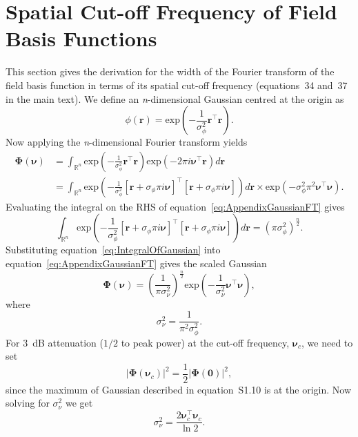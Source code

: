 \documentclass[]{article}
\begin{document}
\section*{Spatial Cut-off Frequency of Field Basis Functions}\label{ap:FrequencyAnalysis}
This section gives the derivation for the width of the Fourier transform of  the field basis function in terms of its spatial cut-off frequency (equations~34 and~37 in the main text). We define an \textit{n}-dimensional Gaussian  centred at the origin as 
\begin{equation}
 \phi(\mathbf r)=\mathrm{exp}\left(-\frac{1}{\sigma_{\phi}^2}\mathbf r^\top\mathbf r\right).
\end{equation}
Now applying the \textit{n}-dimensional Fourier transform yields
\begin{align}\label{eq:AppendixGaussianFT}
 \boldsymbol\Phi(\boldsymbol \nu)&=\int_{\mathbb{R}^n} {\mathrm{exp}\left({-\frac{1}{\sigma_{\phi}^2}\mathbf r^\top\mathbf r}\right)\mathrm{exp}\left(-2\pi i\boldsymbol\nu^\top\mathbf r\right)d\mathbf r} \nonumber \\
&=\int_{\mathbb{R}^n}\mathrm{exp}\left(-\frac{1}{\sigma_{\phi}^2}\left[\mathbf r +\sigma_{\phi}\pi i \boldsymbol\nu\right]^\top\left[\mathbf r +\sigma_{\phi}\pi i \boldsymbol\nu\right]\right)d\mathbf r \times\mathrm{exp}\left(-\sigma_{\phi}^2\pi^2\boldsymbol\nu^\top \boldsymbol\nu\right).
\end{align}
Evaluating the integral on the RHS of equation~\ref{eq:AppendixGaussianFT} gives 
\begin{equation}\label{eq:IntegralOfGaussian}
\int_{\mathbb{R}^n}\mathrm{exp}\left(-\frac{1}{\sigma_{\phi}^2}\left[\mathbf r +\sigma_{\phi}\pi i \boldsymbol\nu\right]^\top\left[\mathbf r +\sigma_{\phi}\pi i \boldsymbol\nu\right]\right)d\mathbf r
=\left(\pi\sigma_{\phi}^2\right)^{\frac{n}{2}}.
\end{equation}
Substituting equation~\ref{eq:IntegralOfGaussian} into equation~\ref{eq:AppendixGaussianFT} gives the scaled Gaussian
\begin{equation}\label{eq:FTofGaussian}
\boldsymbol\Phi(\boldsymbol \nu)=\left(\frac{1}{\pi\sigma_{\nu}^2}\right)^{\frac{n}{2}}\mathrm{exp}\left(-\frac{1}{\sigma_{\nu}^2}\boldsymbol\nu^\top \boldsymbol\nu\right),
\end{equation} 
where 
\begin{equation}
	\sigma_{\nu}^2=\frac{1}{\pi^2\sigma_{\phi}^2}. 
\end{equation}
For $3$~dB attenuation ($1/2$ to peak power) at the cut-off frequency, $\boldsymbol\nu_c$, we need to set
\begin{equation}
 \left|\boldsymbol\Phi(\boldsymbol\nu_{c})\right|^2=\frac{1}{2}\left|\boldsymbol\Phi(\mathbf 0)\right|^2,
\end{equation}
since the maximum of Gaussian described in equation~S1.10 is at the origin. Now solving for $\sigma_{\nu}^2$ we get
\begin{equation}
 \sigma_{\nu}^2=\frac{2\boldsymbol\nu_{c}^\top \boldsymbol\nu_{c}}{\ln 2 }.
\end{equation}
\end{document}
